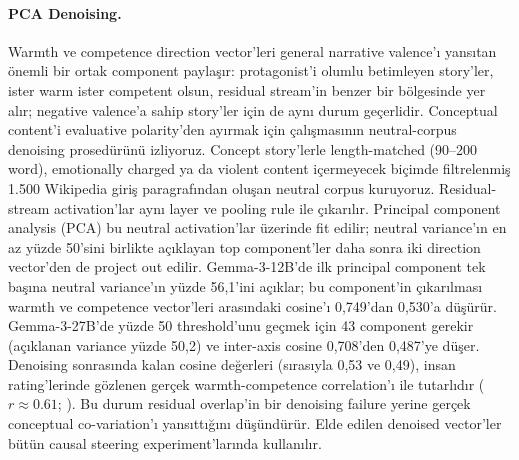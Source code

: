 \documentclass[twocolumn]{article}
\begin{document}
\paragraph{PCA Denoising.}
Warmth ve competence direction vector'leri general narrative valence'ı yansıtan
önemli bir ortak component paylaşır: protagonist'i olumlu betimleyen story'ler,
ister warm ister competent olsun, residual stream'in benzer bir bölgesinde yer
alır; negative valence'a sahip story'ler için de aynı durum geçerlidir.
Conceptual content'i evaluative polarity'den ayırmak için
\citet{sofroniew2026emotion} çalışmasının neutral-corpus denoising prosedürünü
izliyoruz. Concept story'lerle length-matched (90--200 word), emotionally charged
ya da violent content içermeyecek biçimde filtrelenmiş 1.500 Wikipedia giriş
paragrafından oluşan neutral corpus kuruyoruz. Residual-stream activation'lar
aynı layer ve pooling rule ile çıkarılır. Principal component analysis (PCA) bu
neutral activation'lar üzerinde fit edilir; neutral variance'ın en az yüzde
50'sini birlikte açıklayan top component'ler daha sonra iki direction vector'den
de project out edilir. Gemma-3-12B'de ilk principal component tek başına neutral
variance'ın yüzde 56,1'ini açıklar; bu component'in çıkarılması warmth ve
competence vector'leri arasındaki cosine'ı 0,749'dan 0,530'a düşürür.
Gemma-3-27B'de yüzde 50 threshold'unu geçmek için 43 component gerekir (açıklanan
variance yüzde 50,2) ve inter-axis cosine 0,708'den 0,487'ye düşer. Denoising
sonrasında kalan cosine değerleri (sırasıyla 0,53 ve 0,49), insan rating'lerinde
gözlenen gerçek warmth-competence correlation'ı ile tutarlıdır
($r \approx 0.61$; \citealt{fiske2002model}). Bu durum residual overlap'in bir
denoising failure yerine gerçek conceptual co-variation'ı yansıttığını düşündürür.
Elde edilen denoised vector'ler bütün causal steering experiment'larında
kullanılır.
\end{document}
